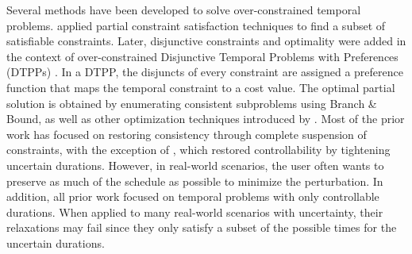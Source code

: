 \documentclass[jair,twoside,11pt,theapa]{article}
\begin{document}
Several methods have been developed to solve over-constrained temporal problems.
 applied partial constraint satisfaction techniques
to find a subset of satisfiable constraints. Later, disjunctive constraints and
optimality were added in the context of over-constrained Disjunctive Temporal
Problems with Preferences (DTPPs) \cite{Peintner_Pref_2005}. In a DTPP, the
disjuncts of every constraint are assigned a preference function that maps the
temporal constraint to a cost value. The optimal partial solution is obtained by
enumerating consistent subproblems using Branch \& Bound, as well as other
optimization techniques introduced by . Most
of the prior work has focused on restoring consistency through complete
suspension of constraints, with the exception of \cite{lanz2015simple}, which
restored controllability by tightening uncertain durations. However, in
real-world scenarios, the user often wants to preserve as much of the schedule
as possible to minimize the perturbation. In addition, all prior work focused on
temporal problems with only controllable durations. When applied to many
real-world scenarios with uncertainty, their relaxations may fail since they
only satisfy a subset of the possible times for the uncertain durations.


%
%
%
%
%
%
%
\end{document}
